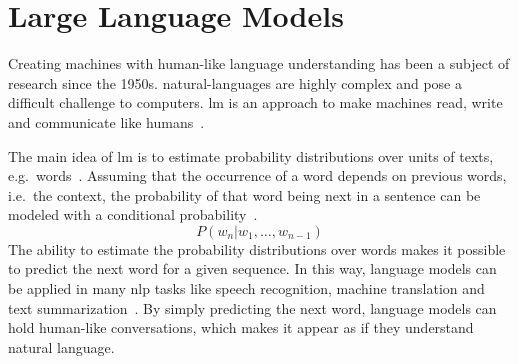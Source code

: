 \chapter{Large Language Models}\label{ch:techOverview}

Creating machines with human-like language understanding has been a subject of research since the 1950s.
\gls{natural-language}s are highly complex and pose a difficult challenge to computers.
\gls{lm} is an approach to make machines read, write and communicate like humans~\autocite{zhao2023survey}.

The main idea of \gls{lm} is to estimate probability distributions over units of texts, e.g.\ words~\autocite{de2015survey}.
Assuming that the occurrence of a word depends on previous words, i.e.\ the context, the probability of that word being next in a sentence can be modeled with a conditional probability~\autocite{jozefowicz2016exploring}.
\[
    P(w_n | w_1, \dots , w_{n-1})
\]
The ability to estimate the probability distributions over words makes it possible to predict the next word for a given sequence.
In this way, language models can be applied in many \gls{nlp} tasks like speech recognition, machine translation and text summarization~\autocite{jozefowicz2016exploring}.
By simply predicting the next word, language models can hold human-like conversations, which makes it appear as if they understand natural language.


